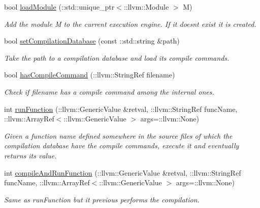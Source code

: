 \begin{DoxyCompactItemize}
\item 
bool \hyperlink{classbellerophon_1_1engine_1_1ExecutionEngineHelper_a8bd642f019fd83f13ad986d9a95245db}{load\+Module} (\+::std\+::unique\+\_\+ptr$<$\+::llvm\+::\+Module $>$ M)
\begin{DoxyCompactList}\small\item\em Add the module {\ttfamily M} to the current execution engine. If it doesn\textquotesingle{}t exist it is created. \end{DoxyCompactList}\item 
bool \hyperlink{classbellerophon_1_1engine_1_1ExecutionEngineHelper_a05a050cb41cc3bf48977f52300e3ae52}{set\+Compilation\+Database} (const \+::std\+::string \&path)
\begin{DoxyCompactList}\small\item\em Take the path to a compilation database and load its compile commands. \end{DoxyCompactList}\item 
bool \hyperlink{classbellerophon_1_1engine_1_1ExecutionEngineHelper_a630f6808c11ca5c1dca005836af9ed59}{has\+Compile\+Command} (\+::llvm\+::\+String\+Ref filename)
\begin{DoxyCompactList}\small\item\em Check if {\ttfamily filename} has a compile command among the internal ones. \end{DoxyCompactList}\item 
int \hyperlink{classbellerophon_1_1engine_1_1ExecutionEngineHelper_a9f68c7cf6f58e299de0a06d96ada4fb2}{run\+Function} (\+::llvm\+::\+Generic\+Value \&retval, \+::llvm\+::\+String\+Ref func\+Name, \+::llvm\+::\+Array\+Ref$<$\+::llvm\+::\+Generic\+Value $>$ args=\+::llvm\+::\+None)
\begin{DoxyCompactList}\small\item\em Given a function name defined somewhere in the source files of which the compilation database have the compile commands, execute it and eventually returns its value. \end{DoxyCompactList}\item 
\hypertarget{classbellerophon_1_1engine_1_1ExecutionEngineHelper_a27e7e4fb1ba23cc31f4ff5e4aa227aa7}{}\label{classbellerophon_1_1engine_1_1ExecutionEngineHelper_a27e7e4fb1ba23cc31f4ff5e4aa227aa7} 
int \hyperlink{classbellerophon_1_1engine_1_1ExecutionEngineHelper_a27e7e4fb1ba23cc31f4ff5e4aa227aa7}{compile\+And\+Run\+Function} (\+::llvm\+::\+Generic\+Value \&retval, \+::llvm\+::\+String\+Ref func\+Name, \+::llvm\+::\+Array\+Ref$<$\+::llvm\+::\+Generic\+Value $>$ args=\+::llvm\+::\+None)
\begin{DoxyCompactList}\small\item\em Same as run\+Function but it previous performs the compilation. \end{DoxyCompactList}\end{DoxyCompactItemize}

